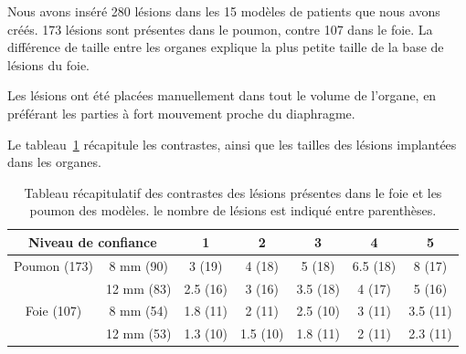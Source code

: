 Nous avons inséré 280 lésions dans les 15 modèles de patients que nous avons créés. 173 lésions sont présentes dans le poumon, contre 107 dans le foie. La différence de taille entre les organes explique la plus petite taille de la base de lésions du foie. 

Les lésions ont été placées manuellement dans tout le volume de l'organe, en préférant les parties à fort mouvement proche du diaphragme. 

Le tableau~\ref{tab:contrastePoumonFoieRecap} récapitule les contrastes, ainsi que les tailles des lésions implantées dans les organes.
 
\begin{table}
\centering
 \begin{tabular}{|c|c||c|c|c|c|c|} 
\hline
\multicolumn{2}{|c|}{Niveau de confiance}       & 1	  & 2	    & 3	     & 4	& 5	\\
\hline
\hline
Poumon	(173)	& 8 mm (90)	& 3 (19)  & 4 (18)  & 5 (18)  & 6.5 (18)	& 8 (17)\\
\cline{2-7}
		& 12 mm	(83)	& 2.5 (16)& 3 (16)  & 3.5 (18)& 4 (17)	& 5 (16)\\
\hline
Foie 	(107)	& 8 mm (54)		& 1.8 (11)& 2 (11)  & 2.5 (10)& 3 (11)	& 3.5 (11)\\
\cline{2-7}
		& 12 mm	(53)	& 1.3 (10)& 1.5 (10)& 1.8 (11)& 2 (11)  & 2.3 (11)\\
\hline 
 \end{tabular}

\caption[Tableau récapitulatif des lésions]{Tableau récapitulatif des contrastes des lésions présentes dans le foie et les poumon des modèles. le nombre de lésions est indiqué entre parenthèses.}
\label{tab:contrastePoumonFoieRecap}


\end{table}



